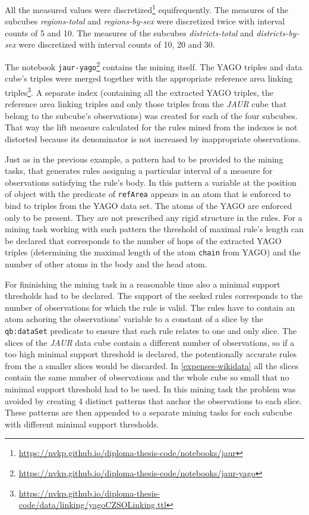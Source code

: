 All the measured values were discretized\footnote{\href{https://nvkp.github.io/diploma-thesis-code/notebooks/jaur}{https://nvkp.github.io/diploma-thesis-code/notebooks/jaur}} equifrequently. The measures of the subcubes \textit{regions-total} and \textit{regions-by-sex} were discretized twice with interval counts of 5 and 10. The measures of the subcubes \textit{districts-total} and \textit{districts-by-sex} were discretized with interval counts of 10, 20 and 30.

The notebook \verb|jaur-yago|\footnote{\href{https://nvkp.github.io/diploma-thesis-code/notebooks/jaur-yago}{https://nvkp.github.io/diploma-thesis-code/notebooks/jaur-yago}} contains the mining itself. The YAGO triples and data cube's triples were merged together with the appropriate reference area linking triples\footnote{\href{https://nvkp.github.io/diploma-thesis-code/data/linking/yagoCZSOLinking.ttl}{https://nvkp.github.io/diploma-thesis-code/data/linking/yagoCZSOLinking.ttl}}. A separate index (containing all the extracted YAGO triples, the reference area linking triples and only those triples from the \textit{JAUR} cube that belong to the subcube's observations) was created for each of the four subcubes. That way the lift measure calculated for the rules mined from the indexes is not distorted because its denominator is not increased by inappropriate observations.

Just as in the previous example, a pattern had to be provided to the mining tasks, that generates rules assigning a particular interval of a measure for observations satisfying the rule's body. In this pattern a variable at the position of object with the predicate of \verb|refArea| appears in an atom that is enforced to bind to triples from the YAGO data set. The atoms of the YAGO are enforced only to be present. They are not prescribed any rigid structure in the rules. For a mining task working with such pattern the threshold of maximal rule's length can be declared that corresponds to the number of hops of the extracted YAGO triples (determining the maximal length of the atom \verb|chain| from YAGO) and the number of other atoms in the body and the head atom.

For fininishing the mining task in a reasonable time also a minimal support thresholds had to be declared. The support of the seeked rules corresponds to the number of observations for which the rule is valid. The rules have to contain an atom achoring the observations' variable to a constant of a slice by the \verb|qb:dataSet| predicate to ensure that each rule relates to one and only slice. The slices of the \textit{JAUR} data cube contain a different number of observations, so if a too high minimal support threshold is declared, the potentionally accurate rules from the a smaller slices would be discarded. In \ref{expenses-wikidata} all the slices contain the same number of observations and the whole cube so small that no minimal support threshold had to be used. In this mining task the problem was avoided by creating 4 distinct patterns that anchor the observations to each slice. These patterns are then appended to a separate mining tasks for each subcube with different minimal support thresholds.

